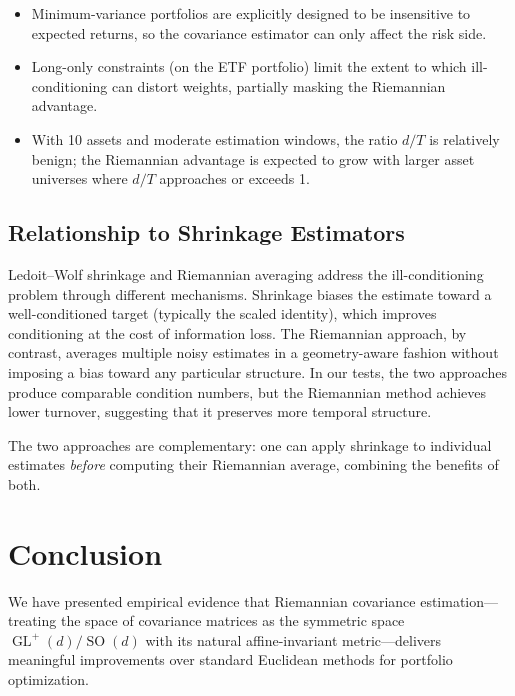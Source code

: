 \documentclass[12pt,a4paper]{article}
\DeclareMathOperator{\GL}{GL}
\DeclareMathOperator{\SO}{SO}
\begin{document}
\begin{itemize}
    \item Minimum-variance portfolios are explicitly designed to be
    insensitive to expected returns, so the covariance estimator can only
    affect the risk side.

    \item Long-only constraints (on the ETF portfolio) limit the extent
    to which ill-conditioning can distort weights, partially masking the
    Riemannian advantage.

    \item With 10 assets and moderate estimation windows, the ratio $d/T$
    is relatively benign; the Riemannian advantage is expected to grow with
    larger asset universes where $d/T$ approaches or exceeds 1.
\end{itemize}

\subsection{Relationship to Shrinkage Estimators}

Ledoit--Wolf shrinkage and Riemannian averaging address the
ill-conditioning problem through different mechanisms. Shrinkage biases
the estimate toward a well-conditioned target (typically the scaled identity),
which improves conditioning at the cost of information loss. The Riemannian
approach, by contrast, averages multiple noisy estimates in a geometry-aware
fashion without imposing a bias toward any particular structure. In our
tests, the two approaches produce comparable condition numbers, but the
Riemannian method achieves lower turnover, suggesting that it preserves
more temporal structure.

The two approaches are complementary: one can apply shrinkage to individual
estimates \emph{before} computing their Riemannian average, combining the
benefits of both.


\section{Conclusion}\label{sec:conclusion}

We have presented empirical evidence that Riemannian covariance estimation---treating
the space of covariance matrices as the symmetric space $\GL^+(d)/\SO(d)$ with
its natural affine-invariant metric---delivers meaningful improvements over
standard Euclidean methods for portfolio optimization.
\end{document}
